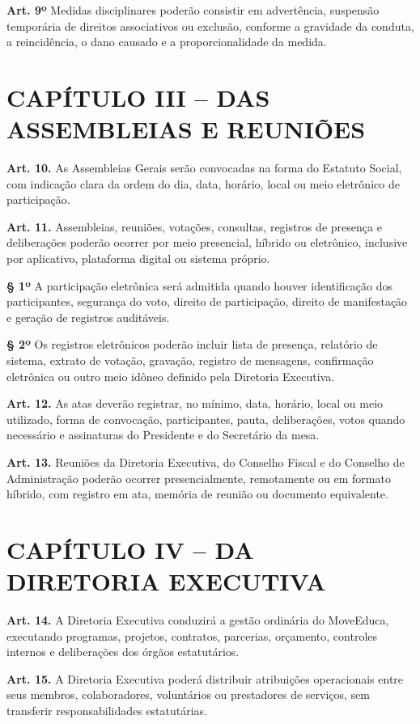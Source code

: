 \documentclass[11pt,a4paper]{article}
\begin{document}
\textbf{Art. 9º} Medidas disciplinares poderão consistir em advertência, suspensão temporária de direitos associativos ou exclusão, conforme a gravidade da conduta, a reincidência, o dano causado e a proporcionalidade da medida.

\section*{CAPÍTULO III -- DAS ASSEMBLEIAS E REUNIÕES}

\textbf{Art. 10.} As Assembleias Gerais serão convocadas na forma do Estatuto Social, com indicação clara da ordem do dia, data, horário, local ou meio eletrônico de participação.

\textbf{Art. 11.} Assembleias, reuniões, votações, consultas, registros de presença e deliberações poderão ocorrer por meio presencial, híbrido ou eletrônico, inclusive por aplicativo, plataforma digital ou sistema próprio.

\textbf{§ 1º} A participação eletrônica será admitida quando houver identificação dos participantes, segurança do voto, direito de participação, direito de manifestação e geração de registros auditáveis.

\textbf{§ 2º} Os registros eletrônicos poderão incluir lista de presença, relatório de sistema, extrato de votação, gravação, registro de mensagens, confirmação eletrônica ou outro meio idôneo definido pela Diretoria Executiva.

\textbf{Art. 12.} As atas deverão registrar, no mínimo, data, horário, local ou meio utilizado, forma de convocação, participantes, pauta, deliberações, votos quando necessário e assinaturas do Presidente e do Secretário da mesa.

\textbf{Art. 13.} Reuniões da Diretoria Executiva, do Conselho Fiscal e do Conselho de Administração poderão ocorrer presencialmente, remotamente ou em formato híbrido, com registro em ata, memória de reunião ou documento equivalente.

\section*{CAPÍTULO IV -- DA DIRETORIA EXECUTIVA}

\textbf{Art. 14.} A Diretoria Executiva conduzirá a gestão ordinária do MoveEduca, executando programas, projetos, contratos, parcerias, orçamento, controles internos e deliberações dos órgãos estatutários.

\textbf{Art. 15.} A Diretoria Executiva poderá distribuir atribuições operacionais entre seus membros, colaboradores, voluntários ou prestadores de serviços, sem transferir responsabilidades estatutárias.
\end{document}
